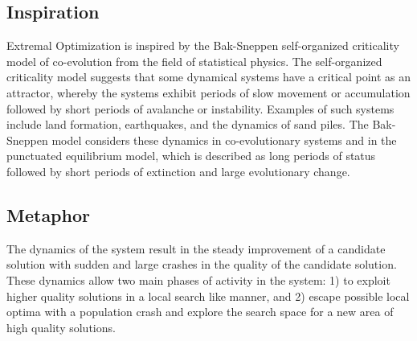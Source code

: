 \subsection{Inspiration}
Extremal Optimization is inspired by the Bak-Sneppen self-organized criticality model of co-evolution from the field of statistical physics. 
The self-organized criticality model suggests that some dynamical systems have a critical point as an attractor, whereby the systems exhibit periods of slow movement or accumulation followed by short periods of avalanche or instability. Examples of such systems include land formation, earthquakes, and the dynamics of sand piles. The Bak-Sneppen model considers these dynamics in co-evolutionary systems and in the punctuated equilibrium model, which is described as long periods of status followed by short periods of extinction and large evolutionary change.

\subsection{Metaphor}
The dynamics of the system result in the steady improvement of a candidate solution with sudden and large crashes in the quality of the candidate solution. These dynamics allow two main phases of activity in the system: 1) to exploit higher quality solutions in a local search like manner, and 2) escape possible local optima with a population crash and explore the search space for a new area of high quality solutions.

